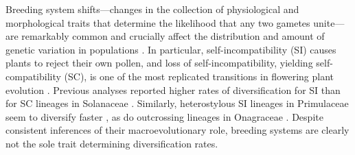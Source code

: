 Breeding system shifts---changes in the collection of physiological and morphological traits that determine the likelihood that any two gametes unite---are remarkably common and crucially affect the distribution and amount of genetic variation in populations \citep{stebbins1974, barrett2013}.
In particular, self-incompatibility (SI) causes plants to reject their own pollen, and loss of self-incompatibility, yielding self-compatibility (SC), is one of the most replicated transitions in flowering plant evolution \citep{stebbins1974,igic_2008}. %
Previous analyses reported higher rates of diversification for SI than for SC lineages in Solanaceae \citep{goldberg_2010}. 
Similarly, heterostylous SI lineages in Primulaceae seem to diversify faster \citep{devos2014}, as do outcrossing lineages in Onagraceae \citep{freyman_2018}.
Despite consistent inferences of their macroevolutionary role, breeding systems are clearly not the sole trait determining diversification rates.

